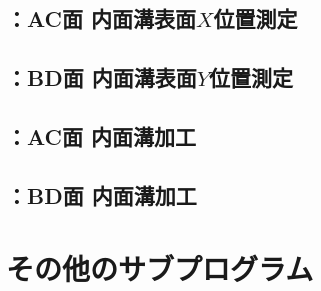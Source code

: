 \clearpage
\subsection{\DMLthreeAC：AC面 内面溝表面$X$位置測定}



\clearpage
\subsection{\DMLthreeBD：BD面 内面溝表面$Y$位置測定}



\clearpage
\subsection{\DKLthreeAC：AC面 内面溝加工}



\clearpage
\subsection{\DKLthreeBD：BD面 内面溝加工}




\clearpage
\section{その他のサブプログラム}


